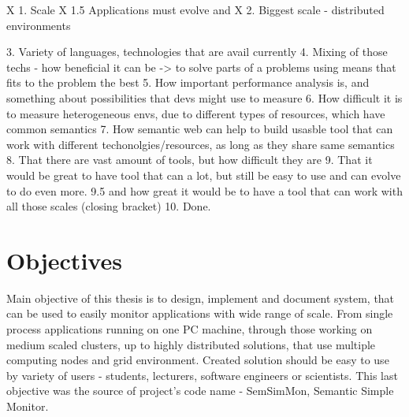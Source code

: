 X 1. Scale
X 1.5 Applications must evolve and 
X 2. Biggest scale - distributed environments

3. Variety of languages, technologies that are avail currently
4. Mixing of those techs - how beneficial it can be -> to solve parts of a problems using means that fits to the problem the best
5. How important performance analysis is, and something about possibilities that devs might use to measure
6. How difficult it is to measure heterogeneous envs, due to different types of resources, which have common semantics
7. How semantic web can help to build usasble tool that can work with different techonolgies/resources, as long as they share same semantics
8. That there are vast amount of tools, but how difficult they are
9. That it would be great to have tool that can a lot, but still be easy to use and can evolve to do even more.
9.5 and how great it would be to have a tool that can work with all those scales (closing bracket)
10. Done.
 





\section{Objectives}
\label{ch1:Objectives}

Main objective of this thesis is to design, implement and document system, that can be used to easily monitor applications with wide range of scale. From single process applications running on one PC machine, through those working on medium scaled clusters, up to highly distributed solutions, that use multiple computing nodes and grid environment. Created solution should be easy to use by variety of users - students, lecturers, software engineers or scientists. This last objective was the source of project's code name - SemSimMon, Semantic Simple Monitor. 

